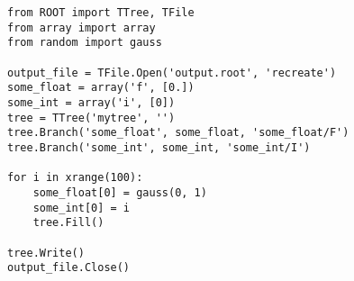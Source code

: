 \begin{footnotesize}
\begin{verbatim}
from ROOT import TTree, TFile
from array import array
from random import gauss

output_file = TFile.Open('output.root', 'recreate')
some_float = array('f', [0.])
some_int = array('i', [0])
tree = TTree('mytree', '')
tree.Branch('some_float', some_float, 'some_float/F')
tree.Branch('some_int', some_int, 'some_int/I')

for i in xrange(100):
    some_float[0] = gauss(0, 1)
    some_int[0] = i
    tree.Fill()

tree.Write()
output_file.Close()
\end{verbatim}
\end{footnotesize}
